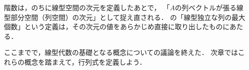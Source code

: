 \begin{mycolumn}
  階数は，のちに線型空間の次元を定義したあとで，
  「$A$の列ベクトルが張る線型部分空間（列空間）の次元」として捉え直される．
  の「線型独立な列の最大個数」という定義は，その次元の値をあらかじめ直接に取り出したものにあたる．
\end{mycolumn}

ここまでで，線型代数の基礎となる概念についての議論を終えた．
次章ではこれらの概念を踏まえて，行列式を定義しよう．